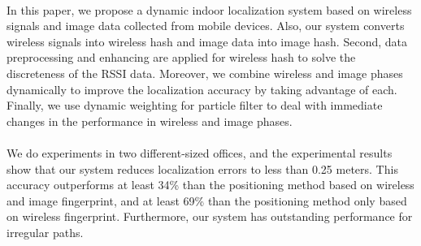\documentclass[a4paper,12pt]{report}
\begin{document}
\paragraph{}
In this paper, we propose a dynamic indoor localization system based on wireless signals and image data collected from mobile devices. Also, our system converts wireless signals into wireless hash and image data into image hash. Second, data preprocessing and enhancing are applied for wireless hash to solve the discreteness of the RSSI data. Moreover, we combine wireless and image phases dynamically to improve the localization accuracy by taking advantage of each. Finally, we use dynamic weighting for particle filter to deal with immediate changes in the performance in wireless and image phases.
%

\paragraph{}
We do experiments in two different-sized offices, and the experimental results show that our system reduces localization errors to less than 0.25 meters. This accuracy outperforms at least 34\% than the positioning method based on wireless and image fingerprint, and at least 69\% than the positioning method only based on wireless fingerprint. Furthermore, our system has outstanding performance for irregular paths.
%
   



\end{document}
